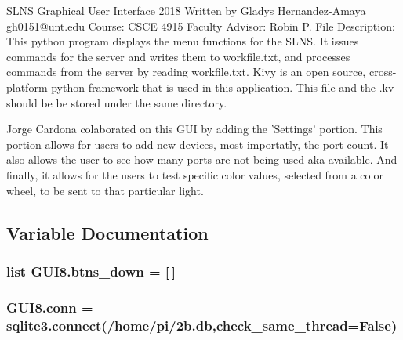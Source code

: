 \begin{DoxyVerb}SLNS Graphical User Interface 2018
Written by Gladys Hernandez-Amaya   gh0151@unt.edu
Course: CSCE 4915
Faculty Advisor: Robin P.
File Description: This python program displays the menu functions for the SLNS. 
It issues commands for the server and writes them to workfile.txt, and processes 
commands from the server by reading workfile.txt. Kivy is an open source,
cross-platform python framework that is used in this application. This file and
the .kv should be be stored under the same directory.

   Jorge Cardona colaborated on this GUI by adding the 'Settings' portion.
   This portion allows for users to add new devices, most importatly, the port count.
   It also allows the user to see how many ports are not being used aka available.
   And finally, it allows for the users to test specific color values, selected from a
  color wheel, to be sent to that particular light.\end{DoxyVerb}
 

\subsection{Variable Documentation}
\subsubsection[{\texorpdfstring{btns\+\_\+down}{btns_down}}]{\setlength{\rightskip}{0pt plus 5cm}list G\+U\+I8.\+btns\+\_\+down = \mbox{[}$\,$\mbox{]}}\hypertarget{namespaceGUI8_ad654a4cc579f4fa13d6c2e88100e51e7}{}\label{namespaceGUI8_ad654a4cc579f4fa13d6c2e88100e51e7}
\subsubsection[{\texorpdfstring{conn}{conn}}]{\setlength{\rightskip}{0pt plus 5cm}G\+U\+I8.\+conn = sqlite3.\+connect(\textquotesingle{}/home/pi/2b.\+db\textquotesingle{},check\+\_\+same\+\_\+thread=\+False)}\hypertarget{namespaceGUI8_a49010b9a16980db6e87f54580689492d}{}\label{namespaceGUI8_a49010b9a16980db6e87f54580689492d}
